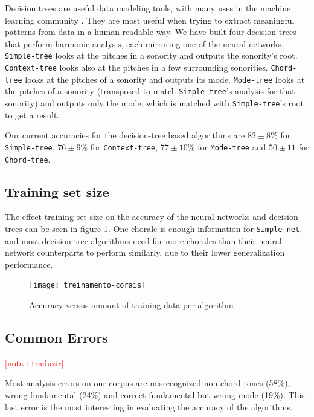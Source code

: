 \documentclass{article}
\newcounter{notacounter}
\newcommand{\nota}[1]{
  \addtocounter{notacounter}{1}
  \textcolor{red}{[nota \arabic{notacounter}: #1]}
}
\begin{document}
Decision trees are useful data modeling tools, with many uses in the
machine learning community \cite{Mitchell:1997:ML,
  russell02:aima}. They are most useful when trying to extract
meaningful patterns from data in a human-readable way. We have built
four decision trees that perform harmonic analysis, each mirroring one
of the neural networks. \texttt{Simple-tree} looks at the pitches in a
sonority and outputs the sonority's root. \texttt{Context-tree} looks
also at the pitches in a few surrounding
sonorities. \texttt{Chord-tree} looks at the pitches of a sonority and
outputs its mode. \texttt{Mode-tree} looks at the pitches of a
sonority (transposed to match \texttt{Simple-tree}'s analysis for that
sonority) and outputs only the mode, which is matched with
\texttt{Simple-tree}'s root to get a result.

Our current accuracies for the decision-tree based algorithms are $82
\pm 8\%$ for \texttt{Simple-tree}, $76 \pm 9\%$ for
\texttt{Context-tree}, $77 \pm 10\%$ for \texttt{Mode-tree} and $50
\pm 11$ for \texttt{Chord-tree}.

\subsection{Training set size}

The effect training set size on the accuracy of the neural networks
and decision trees can be seen in figure
\ref{fig:treinamento-corais}. One chorale is enough information for
\texttt{Simple-net}, and most decision-tree algorithms need far more
chorales than their neural-network counterparts to perform similarly,
due to their lower generalization performance.

\begin{figure}
  \texttt{[image: treinamento-corais]}
  \caption{Accuracy versus amount of training data per algorithm}
  \label{fig:treinamento-corais}
\end{figure}


\subsection{Common Errors}
\label{sec:common-errors}

\nota{traduzir}

Most analysis errors on our corpus are misrecognized non-chord tones
(58\%), wrong fundamental (24\%) and correct fundamental but wrong mode
(19\%). This last error is the most interesting in evaluating the
accuracy of the algorithms.
\end{document}
